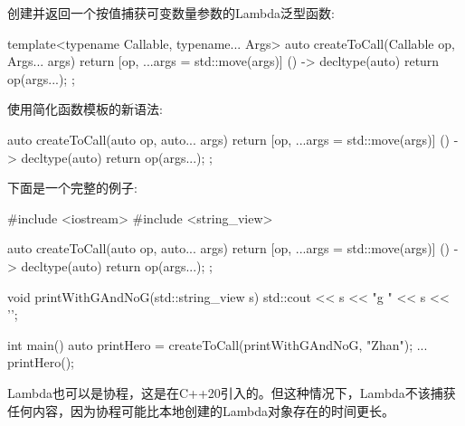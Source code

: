 
创建并返回一个按值捕获可变数量参数的Lambda泛型函数:

\begin{cpp}
template<typename Callable, typename... Args>
auto createToCall(Callable op, Args... args)
{
	return [op, ...args = std::move(args)] () -> decltype(auto) {
				return op(args...);
			};
}
\end{cpp}

使用简化函数模板的新语法:

\begin{cpp}
auto createToCall(auto op, auto... args)
{
	return [op, ...args = std::move(args)] () -> decltype(auto) {
				return op(args...);
			};
}
\end{cpp}

下面是一个完整的例子:


\begin{cpp}
#include <iostream>
#include <string_view>

auto createToCall(auto op, auto... args)
{
	return [op, ...args = std::move(args)] () -> decltype(auto) {
		return op(args...);
	};
}

void printWithGAndNoG(std::string_view s)
{
	std::cout << s << "g " << s << '\n';
}

int main()
{
	auto printHero = createToCall(printWithGAndNoG, "Zhan");
	...
	printHero();
}
\end{cpp}



Lambda也可以是协程，这是在C++20引入的。但这种情况下，Lambda不该捕获任何内容，因为协程可能比本地创建的Lambda对象存在的时间更长。













